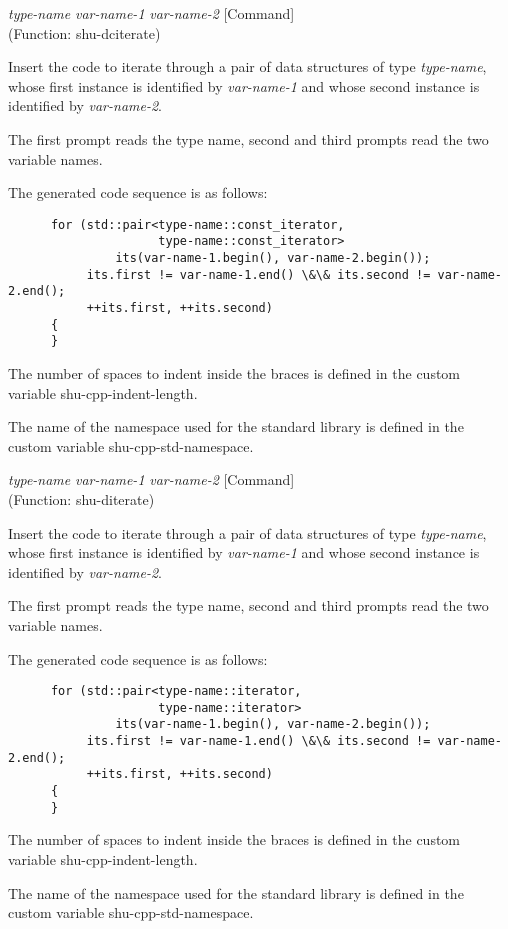 \vspace{1em}
\noindent
{}
\usebox{\funcname}\emph{type-name} \emph{var-name-1} \emph{var-name-2}
 \hfill [Command]\\%
 (Function: shu-dciterate)

\begin{doc-string}
Insert the code to iterate through a pair of data structures of type
\emph{type-name}, whose first instance is identified by \emph{var-name-1} and whose second
instance is identified by \emph{var-name-2}.

The first prompt reads the type name, second and third prompts read the two
variable names.

The generated code sequence is as follows:

\small{\begin{verbatim}
      for (std::pair<type-name::const_iterator,
                     type-name::const_iterator>
               its(var-name-1.begin(), var-name-2.begin());
           its.first != var-name-1.end() \&\& its.second != var-name-2.end();
           ++its.first, ++its.second)
      {
      }
\end{verbatim}}

The number of spaces to indent inside the braces is defined in the custom
variable shu-cpp-indent-length.

The name of the namespace used for the standard library is defined in the custom
variable shu-cpp-std-namespace.
\end{doc-string}

\vspace{1em}
\noindent
{}
\usebox{\funcname}\emph{type-name} \emph{var-name-1} \emph{var-name-2}
 \hfill [Command]\\%
 (Function: shu-diterate)

\begin{doc-string}
Insert the code to iterate through a pair of data structures of type
\emph{type-name}, whose first instance is identified by \emph{var-name-1} and whose second
instance is identified by \emph{var-name-2}.

The first prompt reads the type name, second and third prompts read the two
variable names.

The generated code sequence is as follows:

\small{\begin{verbatim}
      for (std::pair<type-name::iterator,
                     type-name::iterator>
               its(var-name-1.begin(), var-name-2.begin());
           its.first != var-name-1.end() \&\& its.second != var-name-2.end();
           ++its.first, ++its.second)
      {
      }
\end{verbatim}}

The number of spaces to indent inside the braces is defined in the custom
variable shu-cpp-indent-length.

The name of the namespace used for the standard library is defined in the custom
variable shu-cpp-std-namespace.
\end{doc-string}

